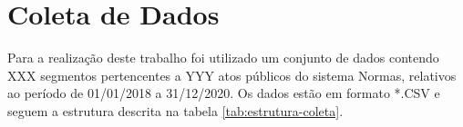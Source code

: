 \chapter{Coleta de Dados}

Para a realização deste trabalho foi utilizado um conjunto de dados contendo XXX segmentos pertencentes a YYY atos públicos do sistema Normas, relativos ao período de 01/01/2018 a 31/12/2020. Os dados estão em formato *.CSV e seguem a estrutura descrita na tabela \ref{tab:estrutura-coleta}.

    